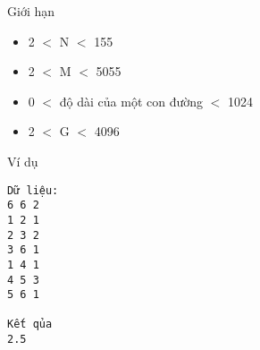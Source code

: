 Giới hạn
\begin{itemize}
	\item     2 $<$ N $<$ 155   
	\item     2 $<$ M $<$ 5055   
	\item     0 $<$ độ dài của một con đường $<$ 1024   
	\item     2 $<$ G $<$ 4096   
\end{itemize}
Ví dụ
\begin{verbatim}
Dữ liệu:
6 6 2
1 2 1
2 3 2
3 6 1
1 4 1
4 5 3
5 6 1

Kết qủa
2.5
\end{verbatim}